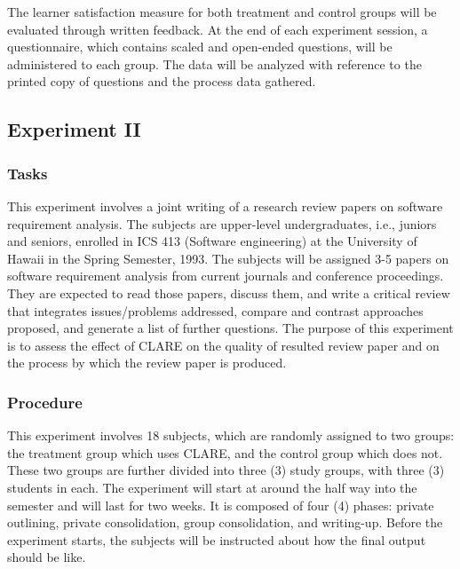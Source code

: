 The learner satisfaction measure for both treatment and control groups will
be evaluated through written feedback. At the end of each experiment
session, a questionnaire, which contains scaled and open-ended questions,
will be administered to each group. The data will be analyzed with
reference to the printed copy of questions and the process data gathered.


\subsection{Experiment II}

\subsubsection{Tasks}

This experiment involves a joint writing of a research review papers on
software requirement analysis. The subjects are upper-level undergraduates,
i.e., juniors and seniors, enrolled in ICS 413 (Software engineering) at
the University of Hawaii in the Spring Semester, 1993. The subjects will be
assigned 3-5 papers on software requirement analysis from current journals
and conference proceedings. They are expected to read those papers, discuss
them, and write a critical review that integrates issues/problems
addressed, compare and contrast approaches proposed, and generate a list of
further questions. The purpose of this experiment is to assess the effect
of CLARE on the quality of resulted review paper and on the process by
which the review paper is produced.


\subsubsection{Procedure}

This experiment involves 18 subjects, which are randomly assigned to two
groups: the treatment group which uses CLARE, and the control group which
does not. These two groups are further divided into three (3) study groups,
with three (3) students in each. The experiment will start at around the
half way into the semester and will last for two weeks. It is composed of
four (4) phases: private outlining, private consolidation, group
consolidation, and writing-up. Before the experiment starts, the subjects
will be instructed about how the final output should be like.

